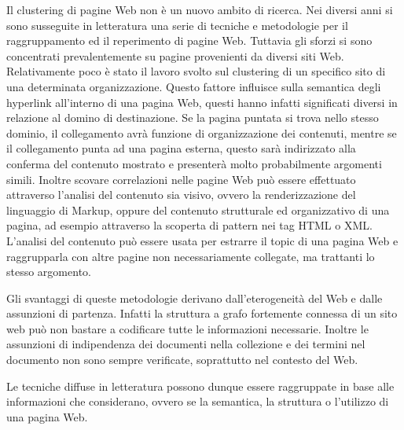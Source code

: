 


Il clustering di pagine Web non è un nuovo ambito di ricerca. Nei diversi anni si sono susseguite in letteratura una serie di tecniche e metodologie per il raggruppamento ed il reperimento di pagine Web. 
Tuttavia gli sforzi si sono concentrati prevalentemente su pagine provenienti da diversi siti Web. Relativamente poco è stato il lavoro svolto sul clustering di un specifico sito di una determinata organizzazione. Questo fattore influisce sulla semantica degli hyperlink all'interno di una pagina Web, questi hanno infatti significati diversi in relazione al domino di destinazione. Se la pagina puntata si trova nello stesso dominio, il collegamento avrà funzione di organizzazione dei contenuti, mentre se il collegamento punta ad una pagina esterna, questo sarà indirizzato alla conferma del contenuto mostrato e presenterà molto probabilmente argomenti simili.
Inoltre scovare correlazioni nelle pagine Web può essere effettuato attraverso l'analisi del contenuto sia visivo, ovvero la renderizzazione del linguaggio di Markup, oppure del contenuto strutturale ed organizzativo di una pagina, ad esempio attraverso la scoperta di pattern nei tag HTML o XML. L'analisi del contenuto può essere usata per estrarre il topic di una pagina Web e raggrupparla con altre pagine non necessariamente collegate, ma trattanti lo stesso argomento. 

Gli svantaggi di queste metodologie derivano dall'eterogeneità del Web e dalle assunzioni di partenza. Infatti la struttura a grafo fortemente connessa di un sito web può non bastare a codificare tutte le informazioni necessarie. Inoltre le assunzioni di indipendenza dei documenti nella collezione e dei termini nel documento non sono sempre verificate, soprattutto nel contesto del Web. 

Le tecniche diffuse in letteratura possono dunque essere raggruppate in base alle informazioni che considerano, ovvero se la semantica, la struttura o l'utilizzo di una pagina Web.

